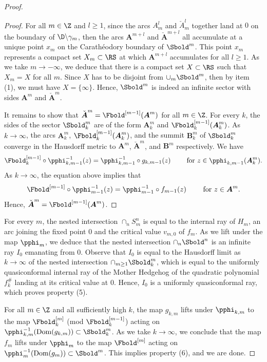 \documentclass{amsart}
\begin{document}
\begin{proof}
\begin{proof}
        For all $m \in \Z$ and $l \geq 1$, since the arcs $A_m^l$ and $\check{A}_m^l$ together land at $0$ on the boundary of $\D \backslash \gamma_{m}$, then the arcs $\boldsymbol{A}^{m+l}$ and $\check{\boldsymbol{A}}^{m+l}$ all accumulate at a unique point $x_m$ on the Carath\'eodory boundary of $\Sbold^{m}$.
        This point $x_m$ represents a compact set $X_m \subset \RS$ at which $\boldsymbol{A}^{m+l}$ accumulates for all $l\geq 1$.
        As we take $m \to -\infty$, we deduce that there is a compact set $X \subset \RS$ such that $X_m = X$ for all $m$.
        Since $X$ has to be disjoint from $\cup_m \Sbold^m$, then by item (1), we must have $X = \{\infty\}$.
        Hence, $\Sbold^m$ is indeed an infinite sector with sides $\boldsymbol{A}^m$ and $\check{\boldsymbol{A}}^m$.
        
        It remains to show that $\check{\boldsymbol{A}}^{m} = \Fbold^{[m-1]}(\boldsymbol{A}^m)$ for all $m \in \Z$.
        For every $k$, the sides of the sector $\Sbold_k^m$ are of the form $\boldsymbol{A}_k^m$ and $\Fbold_{k}^{[m-1]}(\boldsymbol{A}_k^m)$.
        As $k \to \infty$, the arcs $\boldsymbol{A}_k^m$, $\Fbold_{k}^{[m-1]}(\boldsymbol{A}_k^m)$, and the summit $\boldsymbol{B}_k^m$ of $\Sbold_k^m$ converge in the Hausdorff metric to $\boldsymbol{A}^m$, $\check{\boldsymbol{A}}^m$, and $\boldsymbol{B}^m$ respectively.
        We have 
        \[
            \Fbold_{k}^{[m-1]} \circ \pphi_{k,m-1}^{-1}(z) = \pphi_{k,m-1}^{-1} \circ g_{k,m-1}(z) \qquad \text{ for } z \in \pphi_{k,m-1}(\boldsymbol{A}_k^m).
        \]
        As $k \to \infty$, the equation above implies that
        \[
            \Fbold^{[m-1]}  \circ \pphi_{m-1}^{-1}(z) = \pphi_{m-1}^{-1} \circ f_{m-1}(z) \qquad \text{ for } z \in \boldsymbol{A}^m.
        \]
        Hence, $\check{\boldsymbol{A}}^m = \Fbold^{[m-1]}(\boldsymbol{A}^m)$.
    \end{proof}

    For every $m$, the nested intersection $\cap_n S_m^n$ is equal to the internal ray of $H_m$, an arc joining the fixed point $0$ and the critical value $v_{m,0}$ of $f_m$.
    As we lift under the map $\pphi_m$, we deduce that the nested intersection $\cap_n \Sbold^n$ is an infinite ray $I_0$ emanating from $0$.
    Observe that $I_0$ is equal to the Hausdorff limit as $k \to \infty$ of the nested intersection $\cap_{m \geq 1} \Sbold_k^m$, which is equal to the uniformly quasiconformal internal ray of the Mother Hedgehog of the quadratic polynomial $f_k^{\#}$ landing at its critical value at $0$.
    Hence, $I_0$ is a uniformly quasiconformal ray, which proves property (5).

    For all $m \in \Z$ and all sufficiently high $k$, 
    the map $g_{k,m}$ lifts under $\pphi_{k,m}$ to the map
    $\Fbold_k^{[m]}$ (mod $\Fbold_k^{[m-1]}$) acting on $\pphi_{k,m}^{-1}(\text{Dom}(g_{k,m})) \subset \Sbold_k^m$.
    As we take $k \to \infty$, we conclude that the map $f_m$ lifts under $\pphi_m$ to the map $\Fbold^{[m]}$ acting on $\pphi_m^{-1}(\text{Dom}(g_{m})) \subset \Sbold^m$.
    This implies property (6), and we are done.
\end{proof}
\end{document}
